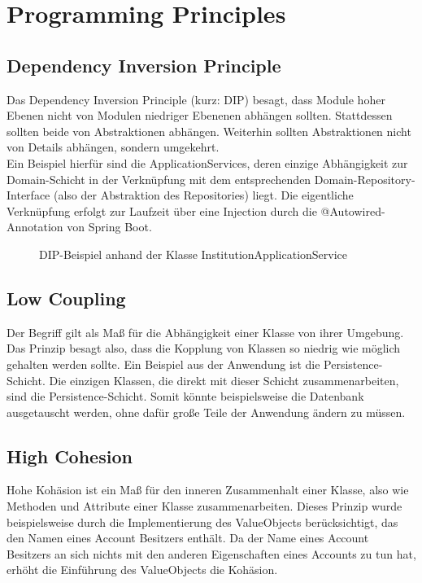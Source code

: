 \chapter{Programming Principles}
\section{Dependency Inversion Principle}
\label{chap:dip}
Das Dependency Inversion Principle (kurz: DIP) besagt, dass Module hoher Ebenen nicht von Modulen niedriger Ebenenen abhängen sollten. Stattdessen sollten beide von Abstraktionen abhängen. Weiterhin sollten Abstraktionen nicht von Details abhängen, sondern umgekehrt.\\
Ein Beispiel hierfür sind die ApplicationServices, deren einzige Abhängigkeit zur Domain-Schicht in der Verknüpfung mit dem entsprechenden Domain-Repository-Interface (also der Abstraktion des Repositories) liegt. Die eigentliche Verknüpfung erfolgt zur Laufzeit über eine Injection durch die @Autowired-Annotation von Spring Boot.
\vspace*{0.5cm}
\begin{figure}[!htb]
    \caption[Dependency Inversion Principle]{DIP-Beispiel anhand der Klasse InstitutionApplicationService}
    \label{fig:dip}
\end{figure}

\section{Low Coupling}
Der Begriff  gilt als Maß für die Abhängigkeit einer Klasse von ihrer Umgebung. Das Prinzip  besagt also, dass die Kopplung von Klassen so niedrig wie möglich gehalten werden sollte. Ein Beispiel aus der Anwendung ist die Persistence-Schicht. Die einzigen Klassen, die direkt mit dieser Schicht zusammenarbeiten, sind die  Persistence-Schicht. Somit könnte beispielsweise die Datenbank ausgetauscht werden, ohne dafür große Teile der Anwendung ändern zu müssen.

\section{High Cohesion}
Hohe Kohäsion ist ein Maß für den inneren Zusammenhalt einer Klasse, also wie  Methoden und Attribute einer Klasse zusammenarbeiten. Dieses Prinzip wurde beispielsweise durch die Implementierung des ValueObjects  berücksichtigt, das den Namen eines Account Besitzers enthält. Da der Name eines Account Besitzers an sich nichts mit den anderen Eigenschaften eines Accounts zu tun hat, erhöht die Einführung des ValueObjects die Kohäsion.

